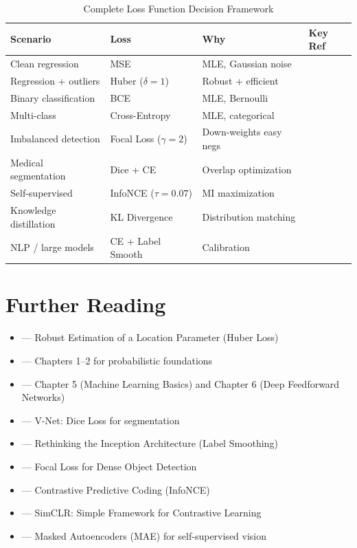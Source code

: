 \begin{table}[ht]
    \centering
    \caption{Complete Loss Function Decision Framework}
    \begin{tabular}{L{3cm} L{3cm} L{4cm} L{3cm}}
        \toprule
        \textbf{Scenario} & \textbf{Loss} & \textbf{Why} & \textbf{Key Ref} \\
        \midrule
        Clean regression & MSE & MLE, Gaussian noise & \\
        Regression + outliers & Huber ($\delta=1$) & Robust + efficient & \cite{huber1964robust} \\
        Binary classification & BCE & MLE, Bernoulli & \\
        Multi-class & Cross-Entropy & MLE, categorical & \\
        Imbalanced detection & Focal Loss ($\gamma=2$) & Down-weights easy negs & \cite{lin2017focal} \\
        Medical segmentation & Dice + CE & Overlap optimization & \cite{milletari2016v} \\
        Self-supervised & InfoNCE ($\tau=0.07$) & MI maximization & \cite{chen2020simple} \\
        Knowledge distillation & KL Divergence & Distribution matching & \\
        NLP / large models & CE + Label Smooth & Calibration & \cite{szegedy2016rethinking} \\
        \bottomrule
    \end{tabular}
\end{table}

\section{Further Reading}

\begin{itemize}
    \item \cite{huber1964robust} --- Robust Estimation of a Location Parameter (Huber Loss)
    \item \cite{bishop2006pattern} --- Chapters 1--2 for probabilistic foundations
    \item \cite{goodfellow2016deep} --- Chapter 5 (Machine Learning Basics) and Chapter 6 (Deep Feedforward Networks)
    \item \cite{milletari2016v} --- V-Net: Dice Loss for segmentation
    \item \cite{szegedy2016rethinking} --- Rethinking the Inception Architecture (Label Smoothing)
    \item \cite{lin2017focal} --- Focal Loss for Dense Object Detection
    \item \cite{oord2018representation} --- Contrastive Predictive Coding (InfoNCE)
    \item \cite{chen2020simple} --- SimCLR: Simple Framework for Contrastive Learning
    \item \cite{he2020masked} --- Masked Autoencoders (MAE) for self-supervised vision
\end{itemize}

